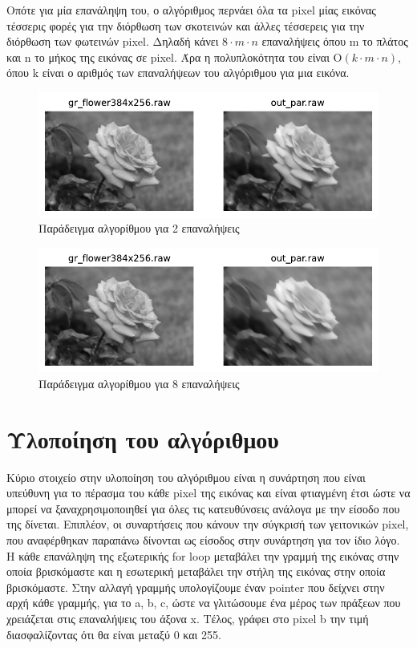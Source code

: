 \documentclass[12pt]{article}
\begin{document}
Οπότε για μία επανάληψη του, ο αλγόριθμος περνάει όλα τα pixel μίας εικόνας τέσσερις φορές για την διόρθωση των σκοτεινών και άλλες τέσσερεις για την διόρθωση των φωτεινών pixel. Δηλαδή κάνει $8\cdot m \cdot n$ επαναλήψεις όπου m το πλάτος και n το μήκος της εικόνας σε pixel. Άρα η πολυπλοκότητα του είναι  $\mathrm{O}(k \cdot m \cdot n)$, όπου k είναι ο αριθμός των επαναλήψεων του αλγόριθμου για μια εικόνα.

\begin{figure}[H]
    \centering
    \includegraphics[width=0.8\linewidth]{./pics/gr_flower384x256.pdf}
    \caption{Παράδειγμα αλγορίθμου για 2 επαναλήψεις}
\end{figure}

\begin{figure}[H]
    \centering
    \includegraphics[width=0.8\linewidth]{./pics/gr_flower384x256_blur.pdf}
    \caption{Παράδειγμα αλγορίθμου για 8 επαναλήψεις}
\end{figure}

\vspace{2em}

\section{Υλοποίηση του αλγόριθμου}

Κύριο στοιχείο στην υλοποίηση του αλγόριθμου είναι η συνάρτηση που είναι υπεύθυνη για το πέρασμα του κάθε pixel της εικόνας και είναι φτιαγμένη έτσι ώστε να μπορεί να ξαναχρησιμοποιηθεί για όλες τις κατευθύνσεις ανάλογα με την είσοδο που της δίνεται. Επιπλέον, οι συναρτήσεις που κάνουν την σύγκρισή των γειτονικών pixel, που αναφέρθηκαν παραπάνω δίνονται ως είσοδος στην συνάρτηση για τον ίδιο λόγο. Η κάθε επανάληψη της εξωτερικής for loop μεταβάλει την γραμμή της εικόνας στην οποία βρισκόμαστε και η εσωτερική μεταβάλει την στήλη της εικόνας στην οποία βρισκόμαστε. Στην αλλαγή γραμμής υπολογίζουμε έναν pointer που δείχνει στην αρχή κάθε γραμμής, για το a, b, c, ώστε να γλιτώσουμε ένα μέρος των πράξεων που χρειάζεται στις επαναλήψεις του άξονα x. Τέλος, γράφει στο pixel b την τιμή διασφαλίζοντας ότι θα είναι μεταξύ 0 και 255.
\end{document}
